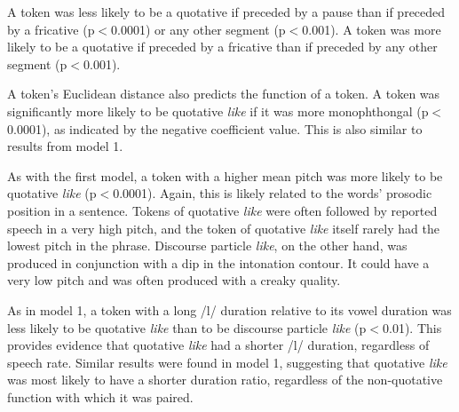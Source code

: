  
A token was less likely to be a quotative if preceded by a pause than if preceded by a fricative (p$<$0.0001) or any other segment (p$<$0.001).   A token was more likely to be a quotative if preceded by a fricative than if preceded by any other segment (p$<$0.001).

A token's Euclidean distance also predicts the function of a token.  A token was significantly more likely to be quotative \textit{like} if it was more monophthongal (p$<$0.0001), as indicated by the negative coefficient value.  This is also similar to results from model 1.  

As with the first model, a token with a higher mean pitch was more likely to be quotative \textit{like} (p$<$0.0001).  Again, this is likely related to the words' prosodic position in a sentence.  Tokens of quotative \textit{like} were often followed by reported speech in a very high pitch, and the token of quotative \textit{like} itself rarely had the lowest pitch in the phrase.  Discourse particle \textit{like}, on the other hand, was produced in conjunction with a dip in the intonation contour.  It could have a very low pitch and was often produced with a creaky quality.

As in model 1, a token with a long /l/ duration relative to its vowel duration was less likely to be quotative \textit{like} than to be discourse particle \textit{like} (p$<$0.01).  This provides evidence that quotative \textit{like} had a shorter /l/ duration, regardless of speech rate.  Similar results were found in model 1, suggesting that quotative \textit{like} was most likely to have a shorter duration ratio, regardless of the non-quotative function with which it was paired.


